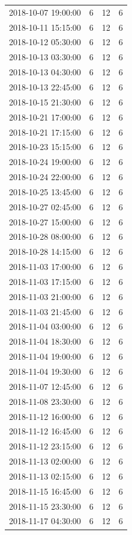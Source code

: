 \begin{tabular}{lrrr}
2018-10-07 19:00:00 & 6 & 12 & 6 \\
2018-10-11 15:15:00 & 6 & 12 & 6 \\
2018-10-12 05:30:00 & 6 & 12 & 6 \\
2018-10-13 03:30:00 & 6 & 12 & 6 \\
2018-10-13 04:30:00 & 6 & 12 & 6 \\
2018-10-13 22:45:00 & 6 & 12 & 6 \\
2018-10-15 21:30:00 & 6 & 12 & 6 \\
2018-10-21 17:00:00 & 6 & 12 & 6 \\
2018-10-21 17:15:00 & 6 & 12 & 6 \\
2018-10-23 15:15:00 & 6 & 12 & 6 \\
2018-10-24 19:00:00 & 6 & 12 & 6 \\
2018-10-24 22:00:00 & 6 & 12 & 6 \\
2018-10-25 13:45:00 & 6 & 12 & 6 \\
2018-10-27 02:45:00 & 6 & 12 & 6 \\
2018-10-27 15:00:00 & 6 & 12 & 6 \\
2018-10-28 08:00:00 & 6 & 12 & 6 \\
2018-10-28 14:15:00 & 6 & 12 & 6 \\
2018-11-03 17:00:00 & 6 & 12 & 6 \\
2018-11-03 17:15:00 & 6 & 12 & 6 \\
2018-11-03 21:00:00 & 6 & 12 & 6 \\
2018-11-03 21:45:00 & 6 & 12 & 6 \\
2018-11-04 03:00:00 & 6 & 12 & 6 \\
2018-11-04 18:30:00 & 6 & 12 & 6 \\
2018-11-04 19:00:00 & 6 & 12 & 6 \\
2018-11-04 19:30:00 & 6 & 12 & 6 \\
2018-11-07 12:45:00 & 6 & 12 & 6 \\
2018-11-08 23:30:00 & 6 & 12 & 6 \\
2018-11-12 16:00:00 & 6 & 12 & 6 \\
2018-11-12 16:45:00 & 6 & 12 & 6 \\
2018-11-12 23:15:00 & 6 & 12 & 6 \\
2018-11-13 02:00:00 & 6 & 12 & 6 \\
2018-11-13 02:15:00 & 6 & 12 & 6 \\
2018-11-15 16:45:00 & 6 & 12 & 6 \\
2018-11-15 23:30:00 & 6 & 12 & 6 \\
2018-11-17 04:30:00 & 6 & 12 & 6 \\

\end{tabular}
